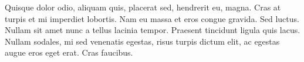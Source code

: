 \documentclass[a4paper]{article}
\begin{document}
Quisque dolor odio, aliquam quis, placerat sed, hendrerit eu, magna. Cras at
turpis et mi imperdiet lobortis. Nam eu massa et eros congue gravida. Sed
luctus. Nullam sit amet nunc a tellus lacinia tempor. Praesent tincidunt ligula
quis lacus. Nullam sodales, mi sed venenatis egestas, risus turpis dictum elit,
ac egestas augue eros eget erat. Cras faucibus.







\end{document}
